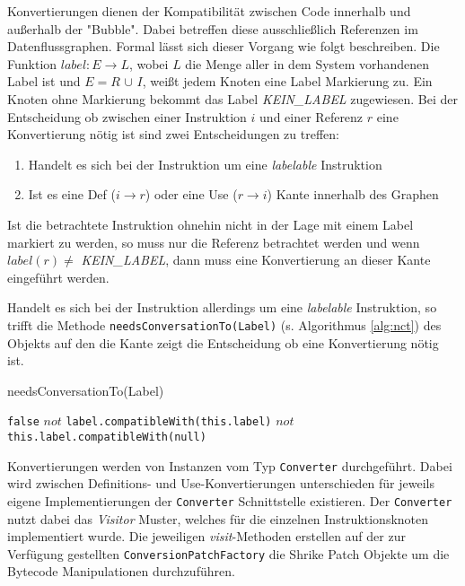 Konvertierungen dienen der Kompatibilität zwischen Code innerhalb und außerhalb der "Bubble". 
Dabei betreffen diese ausschließlich Referenzen im Datenflussgraphen. Formal lässt sich dieser
Vorgang wie folgt beschreiben. Die Funktion $label:E \rightarrow L$, wobei $L$ die Menge aller in dem
System vorhandenen Label ist und $E = R$ $\cup$ $I$, weißt jedem Knoten eine Label Markierung zu. Ein Knoten
ohne Markierung bekommt das Label \textit{KEIN\_LABEL} zugewiesen. Bei der Entscheidung ob 
zwischen einer Instruktion $i$ und einer Referenz $r$ eine Konvertierung nötig ist sind zwei 
Entscheidungen zu treffen:

\begin{enumerate}
	\item Handelt es sich bei der Instruktion um eine \textit{labelable} Instruktion 
	\item Ist es eine Def ($i \rightarrow r$) oder eine Use ($r \rightarrow i$) Kante innerhalb des
	Graphen
\end{enumerate} 

Ist die betrachtete Instruktion ohnehin nicht in der Lage mit einem Label markiert zu werden, so
muss nur die Referenz betrachtet werden und wenn $label(r) \neq$ \textit{KEIN\_LABEL}, dann muss eine 
Konvertierung an dieser Kante eingeführt werden. 

Handelt es sich bei der Instruktion allerdings um eine \textit{labelable} Instruktion, so trifft die Methode
\texttt{needsConversationTo(Label)} (s. Algorithmus \ref{alg:nct}) des Objekts auf den die Kante zeigt die 
Entscheidung ob eine Konvertierung nötig ist.    


\begin{algorithm}[H]
	\caption{needsConversationTo(Label)}\label{alg:nct}
	\begin{algorithmic}[1]
			\RETURN \texttt{false}
		\ENDIF
			\RETURN $not$ \texttt{label.compatibleWith(this.label)}
		\ELSE
			\RETURN $not$ \texttt{this.label.compatibleWith(null)}
		\ENDIF 
	\end{algorithmic}
\end{algorithm}

Konvertierungen werden von Instanzen vom Typ \texttt{Converter} durchgeführt. Dabei wird zwischen Definitions-
und Use-Konvertierungen unterschieden für jeweils eigene Implementierungen der \texttt{Converter} 
Schnittstelle existieren. Der \texttt{Converter} nutzt dabei das \textit{Visitor} Muster, welches
für die einzelnen Instruktionsknoten implementiert wurde. Die jeweiligen \textit{visit}-Methoden erstellen  
auf der zur Verfügung gestellten \texttt{ConversionPatchFactory} die Shrike Patch Objekte um die Bytecode 
Manipulationen durchzuführen. 

